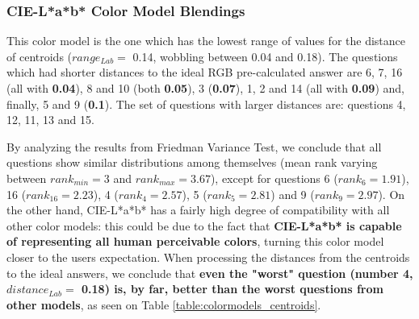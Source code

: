 \subsubsection{CIE-L*a*b* Color Model Blendings}
\label{subsubsec:lchcolormodel}
%
This color model is the one which has the lowest range of values for the distance of centroids ($range_{Lab} = $ 0.14, wobbling between 0.04 and 0.18). The questions which had shorter distances to the ideal RGB pre-calculated answer are 6, 7, 16 (all with \textbf{0.04}), 8 and 10 (both \textbf{0.05}),
3 (\textbf{0.07}), 1, 2 and 14 (all with \textbf{0.09}) and, finally, 5 and 9 (\textbf{0.1}). The set of questions with larger distances are: questions 4, 12, 11, 13 and 15. \par
%
By analyzing the results from Friedman Variance Test, we conclude that all questions show similar distributions among themselves (mean rank varying between $rank_{min} = 3$ and $rank_{max} = 3.67$), except for questions 6 ($rank_{6} = 1.91$), 16 ($rank_{16} = 2.23$), 4 ($rank_{4} = 2.57$),
5 ($rank_{5} = 2.81$) and 9 ($rank_{9} = 2.97$). On the other hand, CIE-L*a*b* has a fairly high degree of compatibility with all other color models: this could be due to the fact that \textbf{CIE-L*a*b* is capable of representing all human perceivable colors}, turning this color model closer to the users
expectation. When processing the distances from the centroids to the ideal answers, we conclude that \textbf{even the "worst" question (number 4, $distance_{Lab} = $ 0.18) is, by far, better than the worst questions from other models}, as seen on Table \ref{table:colormodels_centroids}. \par
%
